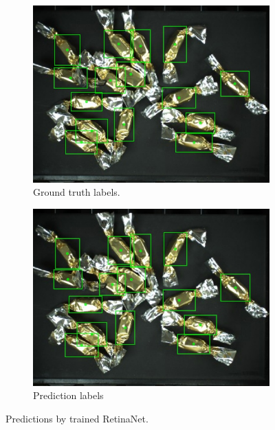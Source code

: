 \begin{figure}[ht]
\begin{subfigure}{0.5\textwidth}
  \end{subfigure}
  \begin{subfigure}{0.5\textwidth}
    \centering
    \includegraphics[width=0.92\linewidth]{Sources/Figures/appendix/actual_80.jpg}
    \caption{Ground truth labels.}

  \end{subfigure}
  \begin{subfigure}{0.5\textwidth}
    \centering
    \includegraphics[width=0.92\linewidth]{Sources/Figures/appendix/pred_80.jpg}
    \caption{Prediction labels}

  \end{subfigure}
  \caption{Predictions by trained RetinaNet.}
  \label{fig:candies_appendix1}
\end{figure}

